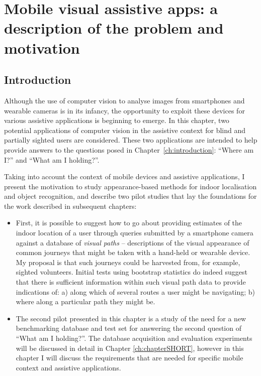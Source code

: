 \chapter{Mobile visual assistive apps: a description of the problem and motivation}\label{ch:chapter2}

\section{Introduction}

Although the use of computer vision to analyse images from smartphones and wearable cameras is in its infancy, the opportunity to exploit these devices for various assistive applications is beginning to emerge. In this chapter, two potential applications of computer vision in the assistive context for blind and partially sighted users are considered. These two applications are intended to help provide answers to the questions posed in Chapter~\ref{ch:introduction}: ``Where am I?'' and ``What am I holding?''.

Taking into account the context of mobile devices and assistive applications, I present the motivation to study appearance-based methods for indoor localisation and object recognition, and describe two pilot studies that lay the foundations for the work described in subsequent chapters:

\begin{itemize}
\item First, it is possible to suggest how to go about providing estimates of the indoor location of a user through queries submitted by a smartphone camera against a database of \textit{visual paths} -- descriptions of the visual appearance of common journeys that might be taken with a hand-held or wearable device. My proposal is that such journeys could be harvested from, for example, sighted volunteers. Initial tests using bootstrap statistics do indeed suggest that there is sufficient information within such visual path data to provide indications of: a) along which of several routes a user might be navigating; b) where along a particular path they might be.
\item The second pilot presented in this chapter is a study of the need for a new benchmarking database and test set for answering the second question of ``What am I holding?''. The database acquisition and evaluation experiments will be discussed in detail in Chapter \ref{ch:chapterSHORT}, however in this chapter I will discuss the requirements that are needed for specific mobile context and assistive applications.
\end{itemize}



